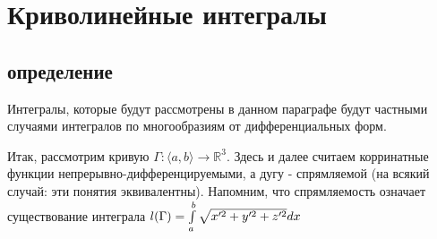\section{Криволинейные интегралы}

\subsection{определение}

Интегралы, которые будут рассмотрены в данном параграфе будут частными случаями интегралов по многообразиям от дифференциальных форм.

Итак, рассмотрим кривую $\Gamma : \langle a, b \rangle \rightarrow \mathbb{R}^3$. 
Здесь и далее считаем корринатные функции непрерывно-дифференцируемыми, а дугу - спрямляемой 
(на всякий случай: эти понятия эквивалентны).
Напомним, что спрямляемость означает существование интеграла $l(\Gamma) = \int\limits_{a}^{b} \sqrt{x'^2 + y'^2 + z'^2}dx$

